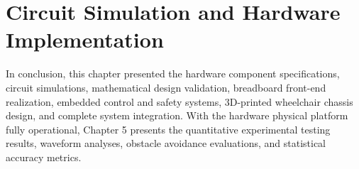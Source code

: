 \chapter{Circuit Simulation and Hardware Implementation}
\label{ch:implementation}










\vspace{1em}
In conclusion, this chapter presented the hardware component specifications, circuit simulations, mathematical design validation, breadboard front-end realization, embedded control and safety systems, 3D-printed wheelchair chassis design, and complete system integration. With the hardware physical platform fully operational, Chapter 5 presents the quantitative experimental testing results, waveform analyses, obstacle avoidance evaluations, and statistical accuracy metrics.
